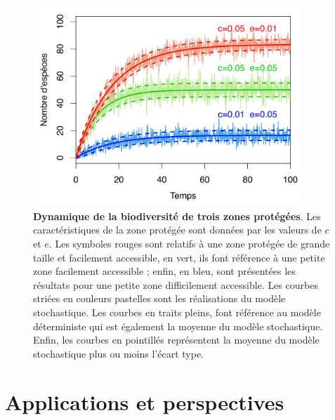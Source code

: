 \begin{figure}[h!]
\centering
\includegraphics[width=0.9\textwidth]{annexe1/fig/figAnnI2.pdf}
\caption[Dynamique de la biodiversité de trois zones protégées]{\textbf{Dynamique de la biodiversité de trois zones protégées}. Les caractéristiques de la zone protégée sont données par les valeurs de $c$ et $e$. Les symboles rouges sont relatifs à une zone protégée de grande taille et facilement accessible, en vert, ils font référence à une petite zone facilement accessible ; enfin, en bleu, sont présentées les résultats pour une petite zone difficilement accessible. Les courbes striées en couleurs pastelles sont les réalisations du modèle stochastique. Les courbes en traits pleins, font référence au modèle déterministe qui est également la moyenne du modèle stochastique. Enfin, les courbes en pointillés représentent la moyenne du modèle stochastique plus ou moins l'écart type.}
\label{figAnnI2}
\end{figure}



\section{Applications et perspectives}


